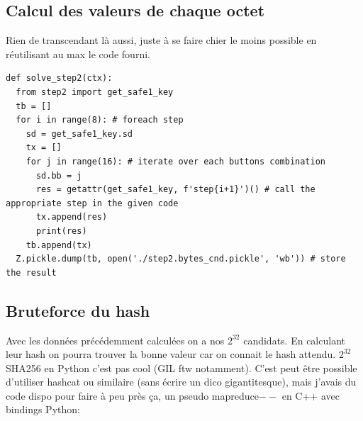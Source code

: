 \documentclass[14pt]{article}
\theoremstyle{definition}
\begin{document}
\subsection{Calcul des valeurs de chaque octet}

Rien de transcendant là aussi, juste à se faire chier le moins possible en réutilisant au max le code fourni.

\begin{verbatim}
def solve_step2(ctx):
  from step2 import get_safe1_key
  tb = []
  for i in range(8): # foreach step
    sd = get_safe1_key.sd
    tx = []
    for j in range(16): # iterate over each buttons combination
      sd.bb = j
      res = getattr(get_safe1_key, f'step{i+1}')() # call the appropriate step in the given code
      tx.append(res)
      print(res)
    tb.append(tx)
  Z.pickle.dump(tb, open('./step2.bytes_cnd.pickle', 'wb')) # store the result
\end{verbatim}

\subsection{Bruteforce du hash}

Avec les données précédemment calculées on a nos $2^{32}$ candidats. En calculant leur hash on pourra trouver la bonne valeur car on connait le hash attendu.
$2^{32}$ SHA256 en Python c'est pas cool (GIL ftw notamment). C'est peut être possible d'utiliser hashcat ou similaire (sans écrire un dico gigantitesque), mais j'avais du code dispo pour faire à peu près ça, un pseudo mapreduce$--$ en C++ avec bindings Python:
\end{document}
